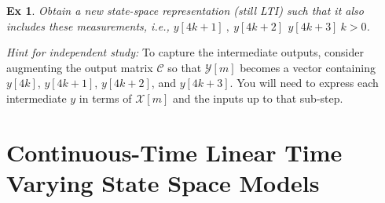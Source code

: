 \documentclass[twoside]{article}
\newtheorem{exmp}[theorem]{Ex}
\begin{document}
\begin{exmp}
	Obtain a new state-space representation (still LTI) such that it also includes these measurements, i.e., $y[4k+1] \ , \ y[4k+2] \, \ y[4k+3] \ k > 0$.
\end{exmp}

\textit{Hint for independent study:} To capture the intermediate outputs, consider augmenting the output matrix $\mathcal{C}$ so that $\mathcal{Y}[m]$ becomes a vector containing $y[4k]$, $y[4k+1]$, $y[4k+2]$, and $y[4k+3]$. You will need to express each intermediate $y$ in terms of $\mathcal{X}[m]$ and the inputs up to that sub-step.

\newpage

\section{Continuous-Time Linear Time Varying State Space Models} 
\end{document}

